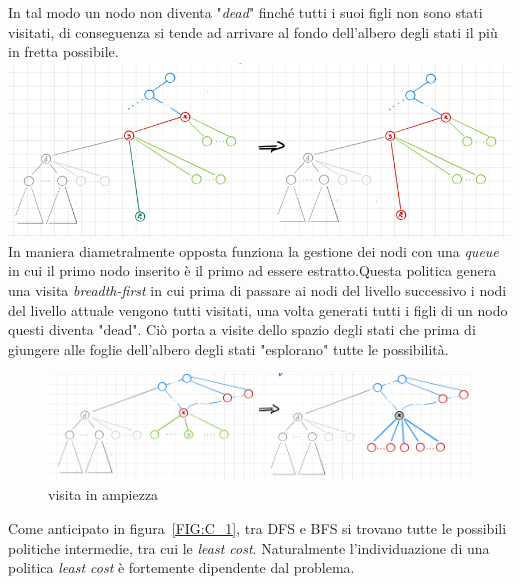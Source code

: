 \documentclass[a4paper]{article}
\begin{document}
In tal modo un nodo non diventa "\emph{dead}" finché tutti i suoi figli non sono stati visitati, di conseguenza si tende ad arrivare al fondo dell'albero degli stati il più in fretta possibile.\\
\includegraphics[width=1\textwidth]{./img/C_1_DFS.png}
In maniera diametralmente opposta funziona la gestione dei nodi con una \emph{queue} in cui il primo nodo inserito è il primo ad essere estratto.Questa politica genera una visita \textit{breadth-first} in cui prima di passare ai nodi del livello successivo i nodi del livello attuale vengono tutti visitati, una volta generati tutti i figli di un nodo questi diventa "dead".
Ciò porta a visite dello spazio degli stati che prima di giungere alle foglie dell'albero degli stati "esplorano" tutte le possibilità.\\
\begin{figure}[!ht]
\centering
\includegraphics[width=1\textwidth]{./img/C_1_BFS.png}
\caption{visita in ampiezza} \label{FIG:C_1_BFS}
\end{figure}
Come anticipato in figura~\ref{FIG:C_1}, tra DFS e BFS si trovano tutte le possibili politiche intermedie, tra cui le \textit{least cost}. Naturalmente l'individuazione di una politica \textit{least cost} è fortemente dipendente dal problema.
\end{document}

